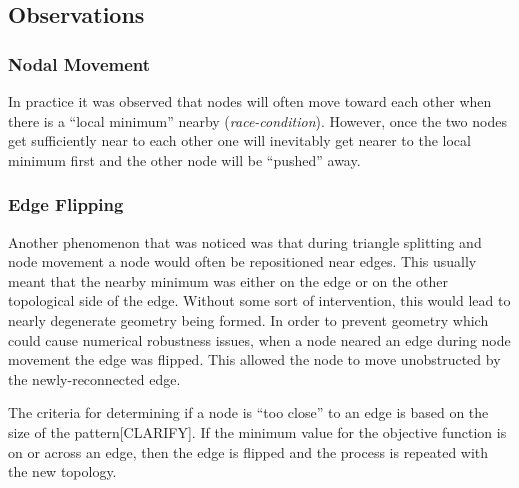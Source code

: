 \subsection{Observations}
\subsubsection{Nodal Movement}
In practice it was observed that nodes will often move toward each other
when there is a ``local minimum'' nearby ({\it race-condition}).
However, once the two nodes get sufficiently near to each other one will
inevitably get nearer to the local minimum first and the other node will
be ``pushed'' away.

\subsubsection{Edge Flipping}
Another phenomenon that was noticed was that during triangle splitting
and node movement a node would often be repositioned near edges. This
usually meant that the nearby minimum was either on the edge or on the
other topological side of the edge. Without some sort of intervention,
this would lead to nearly degenerate geometry being formed. In order to
prevent geometry which could cause numerical robustness issues, when a
node neared an edge during node movement the edge was flipped. This
allowed the node to move unobstructed by the newly-reconnected edge.

The criteria for determining if a node is ``too close'' to an edge is
based on the size of the pattern[CLARIFY]. If the minimum value for the
objective function is on or across an edge, then the edge is flipped and
the process is repeated with the new topology.
